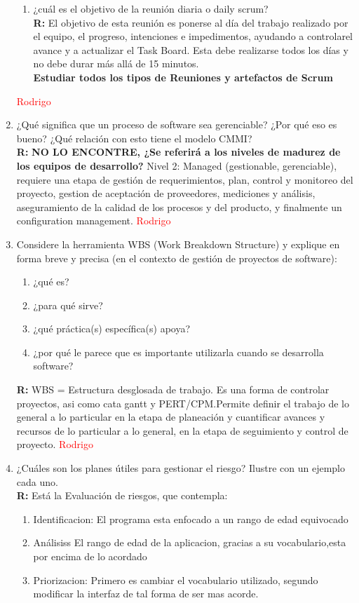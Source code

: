 \begin{enumerate}
\begin{enumerate}
			\item ¿cuál es el objetivo de la reunión diaria o daily scrum?\\
	\textbf{R:}
				El objetivo de esta reunión es ponerse al día del trabajo realizado por el equipo, el progreso,
				intenciones e impedimentos, ayudando a controlarel avance y a actualizar el Task Board.
				Esta debe realizarse todos los días y no debe durar más allá de 15 minutos.\\
				\textbf{Estudiar todos los tipos de Reuniones y artefactos de Scrum}
		\end{enumerate}
	\textcolor{red}{Rodrigo}

	\item  ¿Qué significa que un proceso de software sea gerenciable? ¿Por qué eso es bueno? ¿Qué relación con esto tiene el modelo CMMI?\\
	\textbf{R:}
\textbf{NO LO ENCONTRE, ¿Se referirá a los niveles de madurez de los equipos de desarrollo?} Nivel 2: Managed (gestionable,
gerenciable), requiere una etapa de gestión de requerimientos, plan, control y monitoreo del proyecto,
gestion de aceptación de proveedores, mediciones y análisis, aseguramiento de la calidad de los procesos
y del producto, y finalmente un configuration management.
	\textcolor{red}{Rodrigo}

	\item Considere la herramienta WBS (Work Breakdown Structure) y explique en forma breve y precisa (en el contexto de gestión de proyectos de software):
		\begin{enumerate}
			\item ¿qué es?
			\item ¿para qué sirve?
			\item ¿qué práctica(s) específica(s) apoya?
			\item ¿por qué le parece que es importante utilizarla cuando se desarrolla software?
		\end{enumerate}
	\textbf{R:}
		WBS = Estructura desglosada de trabajo. Es una forma de controlar proyectos, asi como cata gantt y PERT/CPM.Permite
		definir el trabajo de lo general a lo particular en la etapa de planeación y cuantificar avances y
		recursos de lo particular a lo general, en la etapa de seguimiento y control de proyecto.
	\textcolor{red}{Rodrigo}

	\item  ¿Cuáles son los planes útiles para gestionar el riesgo? Ilustre con un ejemplo cada uno.\\
	\textbf{R:}
Está la Evaluación de riesgos, que contempla:
\begin{enumerate}
	\item Identificacion: El  programa esta enfocado  a un rango de edad equivocado
	\item Análisiss El rango de edad de la aplicacion, gracias a su vocabulario,esta por encima de lo acordado
	\item Priorizacion: Primero es cambiar el vocabulario utilizado, segundo modificar la interfaz de tal forma de ser mas acorde.
\end{enumerate}


\end{enumerate}
